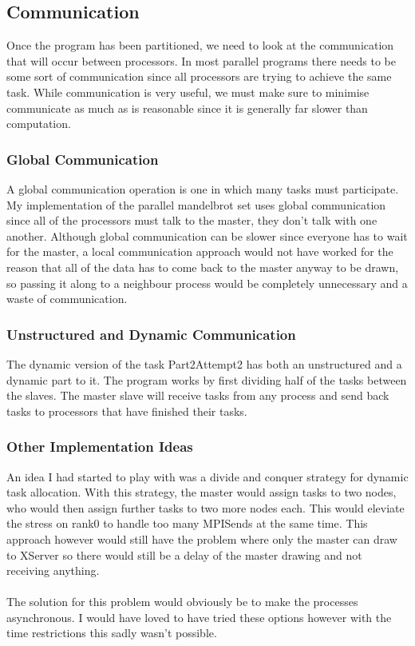 \documentclass{article}
\begin{document}
    \subsection{Communication}
        Once the program has been partitioned, we need to look at the communication that will occur between processors. In most parallel programs
        there needs to be some sort of communication since all processors are trying to achieve the same task. While communication is very useful,
        we must make sure to minimise communicate as much as is reasonable since it is generally far slower than computation.

        \subsubsection{Global Communication}
            A global communication operation is one in which many tasks must participate. My implementation of the parallel mandelbrot set uses global
            communication since all of the processors must talk to the master, they don't talk with one another. Although global communication
            can be slower since everyone has to wait for the master, a local communication approach would not have worked for
            the reason that all of the data has to come back to the master anyway to be drawn, so passing it along to a neighbour process would be 
            completely unnecessary and a waste of communication. 
        
        \subsubsection{Unstructured and Dynamic Communication}
            The dynamic version of the task Part2Attempt2 has both an unstructured and a dynamic part to it. The program works by first dividing half of the
            tasks between the slaves. The master slave will receive tasks from any process and send back tasks to processors that have finished their tasks.

        \subsubsection{Other Implementation Ideas}
            An idea I had started to play with was a divide and conquer strategy for dynamic task allocation. With this strategy, the master would
            assign tasks to two nodes, who would then assign further tasks to two more nodes each. This would eleviate the stress on rank0 to 
            handle too many MPI\textunderscore Sends at the same time. This approach however would still have the problem where only the master can draw to XServer
            so there would still be a delay of the master drawing and not receiving anything.
            \\
            \\
            The solution for this problem would obviously be to make the processes asynchronous. I would have loved to have tried these options however with 
            the time restrictions this sadly wasn't possible.
    
\end{document}
